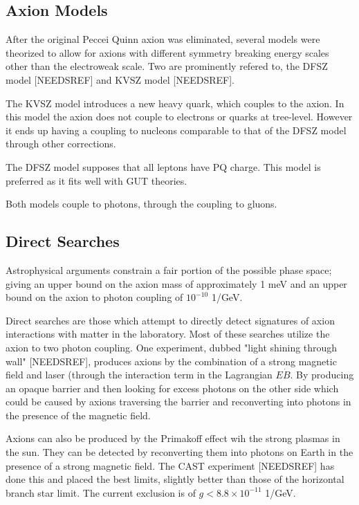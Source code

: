 \documentclass[11pt]{book}
\begin{document}
\subsection{Axion Models}

After the original Peccei Quinn axion was eliminated, several models were theorized to allow for axions with different symmetry breaking energy scales other than the electroweak scale. Two are prominently refered to, the DFSZ model [NEEDSREF] and KVSZ model [NEEDSREF].

The KVSZ model introduces a new heavy quark, which couples to the axion. In this model the axion does not couple to electrons or quarks at tree-level. However it ends up having a coupling to nucleons comparable to that of the DFSZ model through other corrections.

The DFSZ model supposes that all leptons have PQ charge. This model is preferred as it fits well with GUT theories.

Both models couple to photons, through the coupling to gluons.

\subsection{Direct Searches}

Astrophysical arguments constrain a fair portion of the possible phase space; giving an upper bound on the axion mass of approximately 1 meV and an upper bound on the axion to photon coupling of $10^{-10}$ 1/GeV.

Direct searches are those which attempt to directly detect signatures of axion interactions with matter in the laboratory. Most of these searches utilize the axion to two photon coupling. One experiment, dubbed "light shining through wall" [NEEDSREF], produces axions by the combination of a strong magnetic field and laser (through the interaction term in the Lagrangian $E \dot B$. By producing an opaque barrier and then looking for excess photons on the other side which could be caused by axions traversing the barrier and reconverting into photons in the presence of the magnetic field.

Axions can also be produced by the Primakoff effect wih the strong plasmas in the sun. They can be detected by reconverting them into photons on Earth in the presence of a strong magnetic field. The CAST experiment [NEEDSREF] has done this and placed the best limits, slightly better than those of the horizontal branch star limit. The current exclusion is of $g < 8.8 \times 10^{-11}$ 1/GeV.
\end{document}
